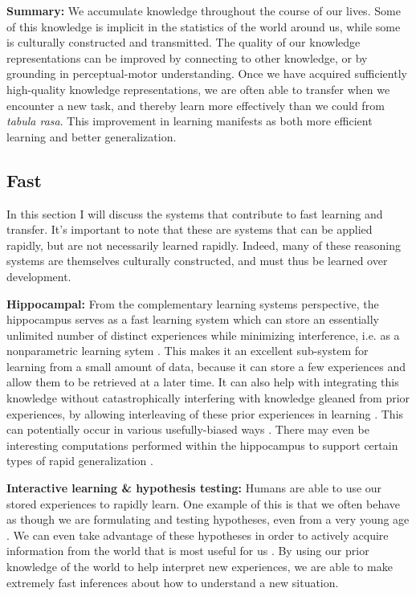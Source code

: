 \textbf{Summary:} We accumulate knowledge throughout the course of our lives. Some of this knowledge is implicit in the statistics of the world around us, while some is culturally constructed and transmitted. The quality of our knowledge representations can be improved by connecting to other knowledge, or by grounding in perceptual-motor understanding. Once we have acquired sufficiently high-quality knowledge representations, we are often able to transfer when we encounter a new task, and thereby learn more effectively than we could from \textit{tabula rasa}. This improvement in learning manifests as both more efficient learning and better generalization. \par

\subsection{Fast}
In this section I will discuss the systems that contribute to fast learning and transfer. It's important to note that these are systems that can be applied rapidly, but are not necessarily learned rapidly. Indeed, many of these reasoning systems are themselves culturally constructed, and must thus be learned over development. \par
\textbf{Hippocampal:} From the complementary learning systems perspective, the hippocampus serves as a fast learning system which can store an essentially unlimited number of distinct experiences while minimizing interference, i.e. as a nonparametric learning sytem \citep{Kumaran2016}. This makes it an excellent sub-system for learning from a small amount of data, because it can store a few experiences and allow them to be retrieved at a later time. It can also help with integrating this knowledge without catastrophically interfering \citep{McCloskey1989} with knowledge gleaned from prior experiences, by allowing interleaving of these prior experiences in learning \citep{McClelland1995}. This can potentially occur in various usefully-biased ways \citep{Kumaran2016, McClelland2020}. There may even be interesting computations performed within the hippocampus to support certain types of rapid generalization \citep{Kumaran2012}. \par 
\textbf{Interactive learning \& hypothesis testing:} Humans are able to use our stored experiences to rapidly learn. One example of this is that we often behave as though we are formulating and testing hypotheses, even from a very young age \citep{Sobel2004, Gopnik2014}. We can even take advantage of these hypotheses in order to actively acquire information from the world that is most useful for us \citep[e.g.][]{Markant2014a}. By using our prior knowledge of the world to help interpret new experiences, we are able to make extremely fast inferences about how to understand a new situation. \par
